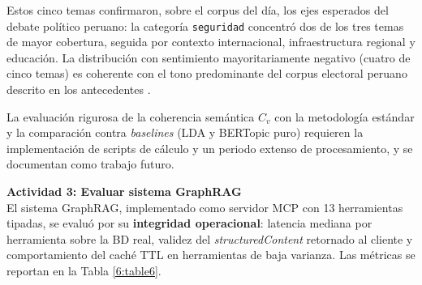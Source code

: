 Estos cinco temas confirmaron, sobre el corpus del día, los ejes esperados del
debate político peruano: la categoría \texttt{seguridad} concentró dos de los tres
temas de mayor cobertura, seguida por contexto internacional, infraestructura
regional y educación. La distribución con sentimiento mayoritariamente negativo
(cuatro de cinco temas) es coherente con el tono predominante del corpus
electoral peruano descrito en los antecedentes
\parencite{pr_alvi2023twitter_election_review, pr_alvarez2023llm_political}.

La evaluación rigurosa de la coherencia semántica $C_v$ con la metodología
estándar y la comparación contra \textit{baselines} (LDA y BERTopic puro)
requieren la implementación de scripts de cálculo y un periodo extenso de
procesamiento, y se documentan como trabajo futuro.

\vspace{0.5cm}
\textbf{Actividad 3: Evaluar sistema GraphRAG}
\\
El sistema GraphRAG, implementado como servidor MCP con 13 herramientas tipadas,
se evaluó por su \textbf{integridad operacional}: latencia mediana por
herramienta sobre la BD real, validez del \textit{structuredContent} retornado al
cliente y comportamiento del caché TTL en herramientas de baja varianza. Las
métricas se reportan en la Tabla \ref{6:table6}.

